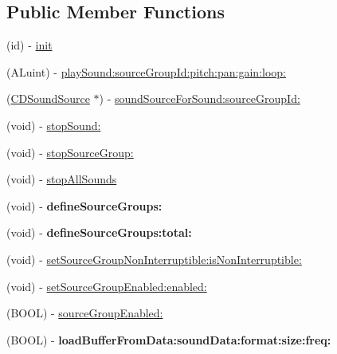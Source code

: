 \subsection*{Public Member Functions}
\begin{DoxyCompactItemize}
\item 
(id) -\/ \hyperlink{interface_c_d_sound_engine_a013cb9b6cf86c0dbfca8fac6aae0bd6a}{init}
\item 
(A\-Luint) -\/ \hyperlink{interface_c_d_sound_engine_aba5e66f1767cf41ef07524e17a1e295e}{play\-Sound\-:source\-Group\-Id\-:pitch\-:pan\-:gain\-:loop\-:}
\item 
(\hyperlink{interface_c_d_sound_source}{C\-D\-Sound\-Source} $\ast$) -\/ \hyperlink{interface_c_d_sound_engine_afdd95c8c9b8ffe667db2215312830e8e}{sound\-Source\-For\-Sound\-:source\-Group\-Id\-:}
\item 
(void) -\/ \hyperlink{interface_c_d_sound_engine_ae2bbd23eefecd32afcf6bc0109b5e7a2}{stop\-Sound\-:}
\item 
(void) -\/ \hyperlink{interface_c_d_sound_engine_a5d6fbd530895fac2ce486a478e46fb23}{stop\-Source\-Group\-:}
\item 
(void) -\/ \hyperlink{interface_c_d_sound_engine_a8bbc63632a5e72c9235c39730e8efb38}{stop\-All\-Sounds}
\item 
\hypertarget{interface_c_d_sound_engine_a5940b79595deabff5cab67987133c518}{(void) -\/ {\bfseries define\-Source\-Groups\-:}}\label{interface_c_d_sound_engine_a5940b79595deabff5cab67987133c518}

\item 
\hypertarget{interface_c_d_sound_engine_a60a79a0a54fcd18139a854d6b1a63be9}{(void) -\/ {\bfseries define\-Source\-Groups\-:total\-:}}\label{interface_c_d_sound_engine_a60a79a0a54fcd18139a854d6b1a63be9}

\item 
(void) -\/ \hyperlink{interface_c_d_sound_engine_ad49927027ac1c88db0bb96907f8ba03f}{set\-Source\-Group\-Non\-Interruptible\-:is\-Non\-Interruptible\-:}
\item 
(void) -\/ \hyperlink{interface_c_d_sound_engine_af2e9e6ed68c37e25d2b9c7a671ab0ea4}{set\-Source\-Group\-Enabled\-:enabled\-:}
\item 
(B\-O\-O\-L) -\/ \hyperlink{interface_c_d_sound_engine_a9e73b1f9ce070579469e18da0fdabf5a}{source\-Group\-Enabled\-:}
\item 
\hypertarget{interface_c_d_sound_engine_afec37cdfa7a31949aaa199f3aa56de9a}{(B\-O\-O\-L) -\/ {\bfseries load\-Buffer\-From\-Data\-:sound\-Data\-:format\-:size\-:freq\-:}}\label{interface_c_d_sound_engine_afec37cdfa7a31949aaa199f3aa56de9a}


\end{DoxyCompactItemize}
